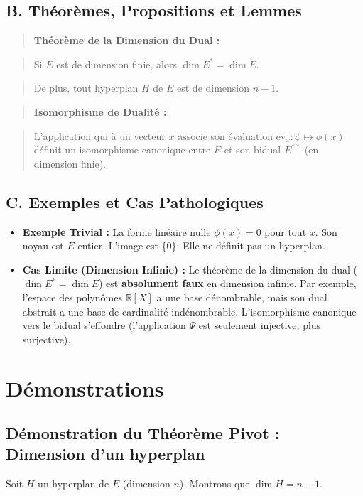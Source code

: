 \documentclass[12pt,a4paper]{report}
\begin{document}
\subsection*{B. Théorèmes, Propositions et Lemmes}
\begin{quote}
\textbf{Théorème de la Dimension du Dual :}
\end{quote}
\begin{quote}
Si $E$ est de dimension finie, alors $\dim E^* = \dim E$.
\end{quote}
\begin{quote}
De plus, tout hyperplan $H$ de $E$ est de dimension $n-1$.
\end{quote}

\begin{quote}
\textbf{Isomorphisme de Dualité :}
\end{quote}
\begin{quote}
L'application qui à un vecteur $x$ associe son évaluation $\text{ev}_x : \phi \mapsto \phi(x)$ définit un isomorphisme canonique entre $E$ et son bidual $E^{**}$ (en dimension finie).
\end{quote}


\subsection*{C. Exemples et Cas Pathologiques}
\begin{itemize}
\item \textbf{Exemple Trivial :} La forme linéaire nulle $\phi(x) = 0$ pour tout $x$. Son noyau est $E$ entier. L'image est $\{0\}$. Elle ne définit pas un hyperplan.
\item \textbf{Cas Limite (Dimension Infinie) :} Le théorème de la dimension du dual ($\dim E^* = \dim E$) est \textbf{absolument faux} en dimension infinie. Par exemple, l'espace des polynômes $\mathbb{R}[X]$ a une base dénombrable, mais son dual abstrait a une base de cardinalité indénombrable. L'isomorphisme canonique vers le bidual s'effondre (l'application $\Psi$ est seulement injective, plus surjective).
\end{itemize}

\section{Démonstrations}
\subsection*{Démonstration du Théorème Pivot : Dimension d'un hyperplan}
Soit $H$ un hyperplan de $E$ (dimension $n$). Montrons que $\dim H = n-1$.
\end{document}
